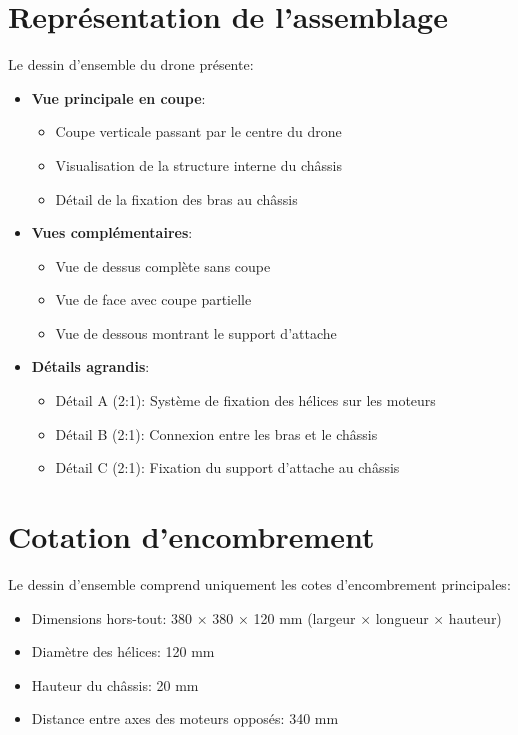 \documentclass[a4paper,12pt]{report}
\begin{document}
\section{Représentation de l'assemblage}
Le dessin d'ensemble du drone présente:

\begin{itemize}
    \item \textbf{Vue principale en coupe}:
    \begin{itemize}
        \item Coupe verticale passant par le centre du drone
        \item Visualisation de la structure interne du châssis
        \item Détail de la fixation des bras au châssis
    \end{itemize}
    
    \item \textbf{Vues complémentaires}:
    \begin{itemize}
        \item Vue de dessus complète sans coupe
        \item Vue de face avec coupe partielle
        \item Vue de dessous montrant le support d'attache
    \end{itemize}
    
    \item \textbf{Détails agrandis}:
    \begin{itemize}
        \item Détail A (2:1): Système de fixation des hélices sur les moteurs
        \item Détail B (2:1): Connexion entre les bras et le châssis
        \item Détail C (2:1): Fixation du support d'attache au châssis
    \end{itemize}
\end{itemize}

\section{Cotation d'encombrement}
Le dessin d'ensemble comprend uniquement les cotes d'encombrement principales:

\begin{itemize}
    \item Dimensions hors-tout: 380 × 380 × 120 mm (largeur × longueur × hauteur)
    \item Diamètre des hélices: 120 mm
    \item Hauteur du châssis: 20 mm
    \item Distance entre axes des moteurs opposés: 340 mm
\end{itemize}
\end{document}
